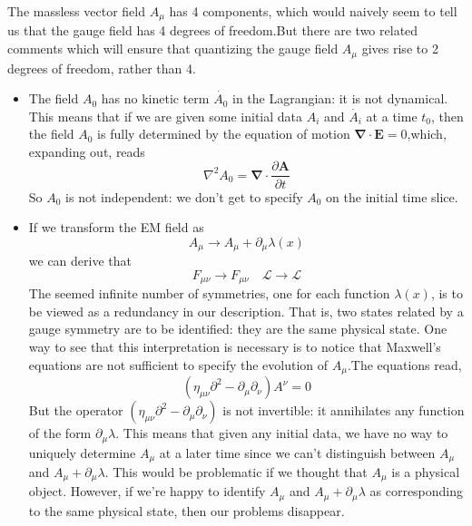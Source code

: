 The massless vector field $A_{\mu}$ has 4 components, which would naively seem to tell us that the gauge field has 4 degrees of freedom.But there are two related comments which will ensure that quantizing the gauge field $A_{\mu}$ gives rise to 2 degrees of freedom, rather than 4.
\begin{itemize}
\item The field $A_0$ has no kinetic term $\dot{A_0}$ in the Lagrangian: it is not dynamical. This means that if we are given some initial data $A_i$ and $\dot{A_i}$ at a time $t_0$, then the field $A_0$ is fully determined by the equation of motion $\bm{\nabla} \cdot \bm{E} = 0$,which, expanding out,
reads
\[\nabla^2 A_0 = \bm{\nabla} \cdot \frac{\partial \bm{A}}{\partial t}\]
So $A_0$ is not independent: we don't get to specify $A_0$ on the initial time slice.
\item If we transform the EM field as
\[A_{\mu} \to A_{\mu} + \partial_{\mu}\lambda(x) \]
we can derive that
\[F_{\mu\nu} \to F_{\mu \nu} \quad \mathcal{L} \to \mathcal{L}\]
The seemed infinite number of symmetries, one for each function $\lambda(x)$, is to be viewed as a redundancy in our description. That is, two states related by a gauge symmetry are to be identified: they are the same physical state. One way to see that this interpretation is necessary is to notice that Maxwell’s equations are not sufficient to specify the evolution of $A_{\mu}$.The equations read,
\[(\eta_{\mu\nu} \partial^2 - \partial_{\mu} \partial_{\nu}) A^{\nu} = 0\]
But the operator $(\eta_{\mu\nu} \partial^2 - \partial_{\mu} \partial_{\nu})$ is not invertible: it annihilates any function of
the form $\partial_{\mu} \lambda$. This means that given any initial data, we have no way to uniquely determine $A_{\mu}$ at a later time since we can't distinguish between $A_{\mu}$ and $A_{\mu} + \partial_{\mu} \lambda$. This would be problematic if we thought that $A_{\mu}$ is a physical object. However, if we're happy to identify $A_{\mu}$ and $A_{\mu} + \partial_{\mu} \lambda$ as corresponding to the same physical state, then our problems disappear. 
\end{itemize}

